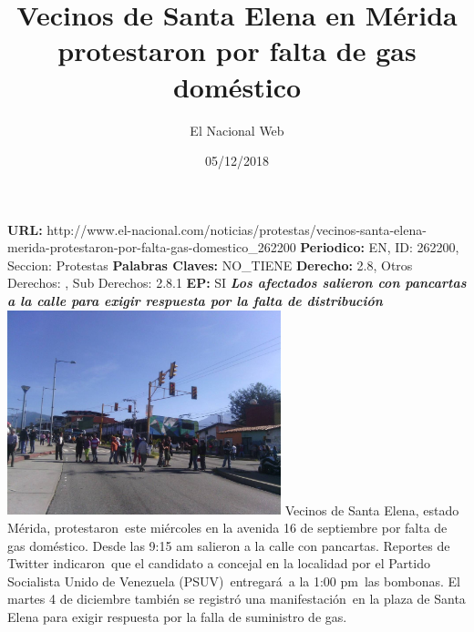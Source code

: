 \documentclass{article}%
\title{\textbf{Vecinos de Santa Elena en Mérida protestaron por falta de gas doméstico}}%
\author{El Nacional Web}%
\date{05/12/2018}%
\begin{document}
%
\normalsize%
\maketitle%
\textbf{URL: }%
http://www.el{-}nacional.com/noticias/protestas/vecinos{-}santa{-}elena{-}merida{-}protestaron{-}por{-}falta{-}gas{-}domestico\_262200\newline%
%
\textbf{Periodico: }%
EN, %
ID: %
262200, %
Seccion: %
Protestas\newline%
%
\textbf{Palabras Claves: }%
NO\_TIENE\newline%
%
\textbf{Derecho: }%
2.8, %
Otros Derechos: %
, %
Sub Derechos: %
2.8.1\newline%
%
\textbf{EP: }%
SI\newline%
\newline%
%
\textbf{\textit{Los afectados salieron con pancartas a la calle para exigir respuesta por la falta de distribución}}%
\newline%
\newline%
%
\includegraphics[width=300px]{4.jpg}%
\newline%
%
Vecinos de Santa Elena, estado Mérida, protestaron~este miércoles en la avenida 16 de septiembre por falta de gas doméstico. Desde las 9:15 am salieron a la calle con pancartas.%
\newline%
%
Reportes de Twitter indicaron~que el candidato a concejal en la localidad por el Partido Socialista Unido de Venezuela (PSUV)~entregará~a la 1:00 pm~las bombonas.%
\newline%
%
El martes 4 de diciembre también se registró una manifestación~en la plaza de Santa Elena para exigir respuesta por la falla de suministro de gas.%
\newline%
%
\end{document}
